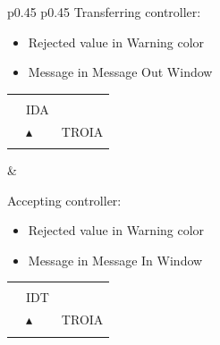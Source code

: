 \documentclass[a4paper,oneside,11pt]{memoir}
\newcommand{\colorref}[1]{\colorbox{Flight Highlight}{\color{#1}#1}}
\begin{document}
\begin{longtable}{p{} p{}}
  Transferring controller:

  \begin{itemize}
    \item Rejected value in \colorref{Warning} color
    \item Message in Message Out Window
  \end{itemize}
  
  \begin{tabular}{
    >{\columncolor{Flight Highlight}}l 
    >{\columncolor{Flight Highlight}}l
    >{\columncolor{Flight Highlight}}l }
    {\color{Warning} H360} & {\color{Assumed} }       & {\color{Assumed} }      \\
    {\color{Assumed} ABC123} & {\color{Coordination} IDA}       & {\color{Assumed} }      \\
    {\color{Assumed} 100}    & {\color{Assumed} $\blacktriangle$} & {\color{Assumed} TROIA} \\
    {\color{Assumed} 180}    & {\color{Assumed} }          & {\color{Assumed} }\\         
  \end{tabular}

  &

  Accepting controller:

  \begin{itemize}
    \item Rejected value in \colorref{Warning} color
    \item Message in Message In Window
  \end{itemize}
  
  \begin{tabular}{
    >{\columncolor{Flight Highlight}}l 
    >{\columncolor{Flight Highlight}}l
    >{\columncolor{Flight Highlight}}l }
    {\color{Warning} H360} & {\color{Coordination} }       & {\color{Coordination} }      \\
    {\color{Coordination} ABC123} & {\color{Coordination} IDT}       & {\color{Coordination} }      \\
    {\color{Coordination} 100}    & {\color{Coordination} $\blacktriangle$} & {\color{Coordination} TROIA} \\
    {\color{Coordination} 180}    & {\color{Coordination} }          & {\color{Coordination} }  \\     
  \end{tabular}
\end{longtable}
\end{document}
